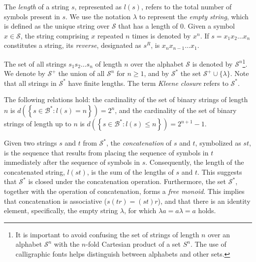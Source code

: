 The \emph{length} of a string $s$, represented as $l(s)$, refers to the total number of symbols present in $s$. We use the notation $\lambda$ to represent the \emph{empty string}, which is defined as the unique string over $\mathcal{S}$ that has a length of 0. Given a symbol $x \in \mathcal{S}$, the string comprising $x$ repeated $n$ times is denoted by $x^n$. If $s = x_1 x_2 \dots x_n$ constitutes a string, its \emph{reverse}, designated as $s^R$, is $x_n x_{n-1} \dots x_1$.

The set of all strings $s_{1}s_{2}\ldots s_{n}$ of length $n$ over the alphabet $\mathcal{S}$ is denoted by $\mathcal{S}^{n}$\footnote{It is important to avoid confusing the set of strings of length $n$ over an alphabet $\mathcal{S}^n$ with the $n$-fold Cartesian product of a set $S^n$. The use of calligraphic fonts helps distinguish between alphabets and other sets.}. We denote by $\mathcal{S}^{+}$ the union of all $\mathcal{S}^{n}$ for $n\geq1$, and by $\mathcal{S}^{\ast}$ the set $\mathcal{S}^{+} \cup \{\lambda\}$. Note that all strings in $\mathcal{S}^{\ast}$ have finite lengths. The term \emph{Kleene closure} refers to $\mathcal{S}^{\ast}$.

\begin{example}
The following relations hold: the cardinality of the set of binary strings of length $n$ is $d \left( \left\{ s \in \mathcal{B}^{\ast} : l(s) = n \right\} \right) = 2^n$, and the cardinality of the set of binary strings of length up to $n$ is $d \left( \left\{ s \in \mathcal{B}^{\ast} : l(s) \leq n \right\} \right) = 2^{n+1}-1$.
\end{example}

Given two strings $s$ and $t$ from $\mathcal{S}^{\ast}$, the \emph{concatenation} of $s$ and $t$, symbolized as $st$, is the sequence that results from placing the sequence of symbols in $t$ immediately after the sequence of symbols in $s$. Consequently, the length of the concatenated string, $l(st)$, is the sum of the lengths of $s$ and $t$. This suggests that $\mathcal{S}^\ast$ is closed under the concatenation operation. Furthermore, the set $\mathcal{S}^\ast$, together with the operation of concatenation, forms a \emph{free monoid}. This implies that concatenation is associative ($s(tr)=(st)r$), and that there is an identity element, specifically, the empty string $\lambda$, for which $\lambda a = a \lambda = a$ holds.

